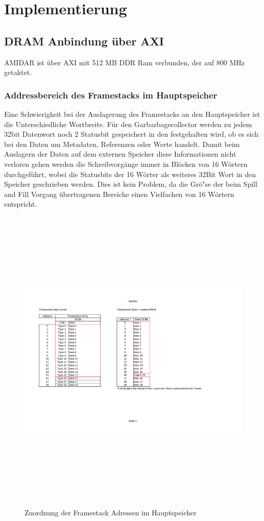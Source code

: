 \chapter{Implementierung}
\label{cha:Implementierung}
\section{DRAM Anbindung \"uber AXI}
AMIDAR ist \"uber AXI mit 512 MB DDR Ram verbunden, der auf 800 MHz getaktet.


\subsection{Addressbereich des Framestacks im Hauptspeicher}
Eine Schwierigkeit bei der Auslagerung des Framestacks an den Hauptspeicher ist die Unterschiedliche Wortbreite. 
F\"ur den Garbarbagecollector werden zu jedem 32bit Datenwort noch 2 Statusbit gespeichert in den festgehalten wird, ob es sich bei den Daten um Metadaten, Referenzen oder Werte handelt. Damit beim Auslagern der Daten auf dem externen Speicher diese Informationen nicht verloren gehen werden die Schreibvorg\"ange immer in Bl\"ocken von 16 W\"ortern durchgef\"uhrt, wobei die Statusbits der 16 W\"orter als weiteres 32Bit Wort in den Speicher geschrieben werden. Dies ist kein Problem, da die Gr\"o"se der beim Spill and Fill Vorgang \"ubertragenen Bereiche einen Vielfachen von 16 W\"ortern entspricht. 

\begin{figure}
	\centering
	\includegraphics[height = 15cm]{PS_RS_graphics/FS Blocks in Ram.pdf}
	\caption{Zuordnung der Framestack Adressen im Hauptspeicher}
\end{figure}


